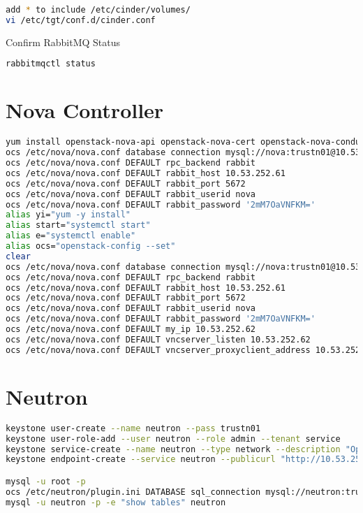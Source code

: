 \documentclass[11pt,letterpaper,oneside]{book}
\begin{document}
\begin{lstlisting}[caption={add * to include /etc/cinder/volumes/},language=bash]
add * to include /etc/cinder/volumes/
vi /etc/tgt/conf.d/cinder.conf
\end{lstlisting}


\begin{flushleft}
\begin{huge} \danger \end{huge} Confirm RabbitMQ Status
\end{flushleft}
\begin{lstlisting}[caption={},language=bash]
rabbitmqctl status
\end{lstlisting}

\chapter{Nova Controller}

\begin{lstlisting}[caption={},language=bash]
yum install openstack-nova-api openstack-nova-cert openstack-nova-conductor openstack-nova-console openstack-nova-novncproxy openstack-nova-scheduler python-novaclient
ocs /etc/nova/nova.conf database connection mysql://nova:trustn01@10.53.252.61/nova
ocs /etc/nova/nova.conf DEFAULT rpc_backend rabbit
ocs /etc/nova/nova.conf DEFAULT rabbit_host 10.53.252.61
ocs /etc/nova/nova.conf DEFAULT rabbit_port 5672
ocs /etc/nova/nova.conf DEFAULT rabbit_userid nova
ocs /etc/nova/nova.conf DEFAULT rabbit_password '2mM7OaVNFKM='
alias yi="yum -y install"
alias start="systemctl start"
alias e="systemctl enable"
alias ocs="openstack-config --set"
clear
ocs /etc/nova/nova.conf database connection mysql://nova:trustn01@10.53.252.61/nova
ocs /etc/nova/nova.conf DEFAULT rpc_backend rabbit
ocs /etc/nova/nova.conf DEFAULT rabbit_host 10.53.252.61
ocs /etc/nova/nova.conf DEFAULT rabbit_port 5672
ocs /etc/nova/nova.conf DEFAULT rabbit_userid nova
ocs /etc/nova/nova.conf DEFAULT rabbit_password '2mM7OaVNFKM='
ocs /etc/nova/nova.conf DEFAULT my_ip 10.53.252.62
ocs /etc/nova/nova.conf DEFAULT vncserver_listen 10.53.252.62
ocs /etc/nova/nova.conf DEFAULT vncserver_proxyclient_address 10.53.252.62
\end{lstlisting}

\chapter{Neutron}

\begin{lstlisting}[caption={Neutron virctlpaw001},language=bash]
keystone user-create --name neutron --pass trustn01
keystone user-role-add --user neutron --role admin --tenant service
keystone service-create --name neutron --type network --description "OpenStack Networking Service"
keystone endpoint-create --service neutron --publicurl "http://10.53.252.63:9696" --adminurl "http://10.53.252.63:9696" --internalurl "http://10.53.252.63:9696"

mysql -u root -p
ocs /etc/neutron/plugin.ini DATABASE sql_connection mysql://neutron:trustn01@10.53.252.61/neutron_ml2
mysql -u neutron -p -e "show tables" neutron
\end{lstlisting}
\end{document}
